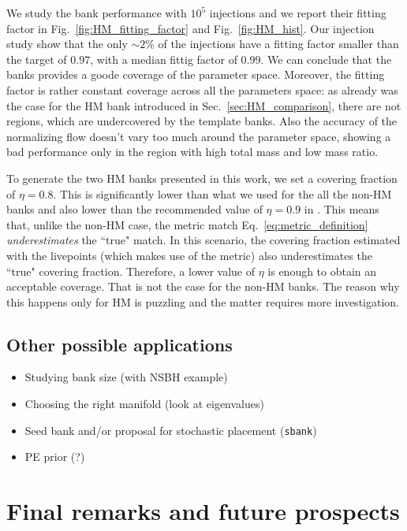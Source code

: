 \documentclass[twocolumn,showpacs,preprintnumbers,nofootinbib,prd,
superscriptaddress,10pt]{revtex4-2}
\begin{document}
We study the bank performance with $10^5$ injections and we report their fitting factor in Fig.~\ref{fig:HM_fitting_factor} and Fig.~\ref{fig:HM_hist}.
Our injection study show that the only $\sim 2\%$ of the injections have a fitting factor smaller than the target of $0.97$, with a median fittig factor of $0.99$. We can conclude that the banks provides a goode coverage of the parameter space.
Moreover, the fitting factor is rather constant coverage across all the parameters space: as already was the case for the HM bank introduced in Sec.~\ref{sec:HM_comparison}, there are not regions, which are undercovered by the template banks.
Also the accuracy of the normalizing flow doesn't vary too much around the parameter space, showing a bad performance only in the region with high total mass and low mass ratio.

To generate the two HM banks presented in this work, we set a covering fraction of $\eta = 0.8$. This is significantly lower than what we used for the all the non-HM banks and also lower than the recommended value of $\eta = 0.9$ in \cite{Coogan:2022qxs}.
This means that, unlike the non-HM case, the metric match Eq.~\ref{eq:metric_definition} {\it underestimates} the ``true" match. In this scenario, the covering fraction estimated with the livepoints (which makes use of the metric) also underestimates the ``true" covering fraction. Therefore, a lower value of $\eta$ is enough to obtain an acceptable coverage. That is not the case for the non-HM banks.
The reason why this happens only for HM is puzzling and the matter requires more investigation.

\subsection{Other possible applications} \label{sec:other_applications}
\begin{itemize}
	\item Studying bank size (with NSBH example)
	\item Choosing the right manifold (look at eigenvalues)
	\item Seed bank and/or proposal for stochastic placement (\texttt{sbank})
	\item PE prior (?)
\end{itemize}

\section{Final remarks and future prospects} \label{sec:conclusion}
\blindtext \blindtext
\end{document}
